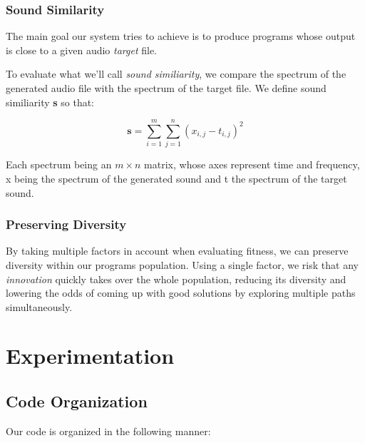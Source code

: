 \documentclass{article}
\begin{document}
\subsubsection{Sound Similarity}

The main goal our system tries to achieve is to produce programs whose output is close to a given audio \textit{target} file.

To evaluate what we'll call \textit{sound similiarity}, we compare the spectrum of the generated audio file with the spectrum of the target file. We define sound similiarity \textbf{s} so that:

\[ \textbf{s} = \sum_{i=1}^{m}\sum_{j=1}^{n}(x_{i,j} - t_{i,j})^2 \]

Each spectrum being an $m\times n$
 matrix, whose axes represent time and frequency, x being the spectrum of the generated sound and t the spectrum of the target sound.

\subsubsection{Preserving Diversity}

By taking multiple factors in account when evaluating fitness, we can preserve diversity within our programs population. Using a single factor, we risk that any \textit{innovation} quickly takes over the whole population, reducing its diversity and lowering the odds of coming up with good solutions by exploring multiple paths simultaneously.

\section{Experimentation}

\subsection{Code Organization}

Our code is organized in the following manner:
\end{document}
